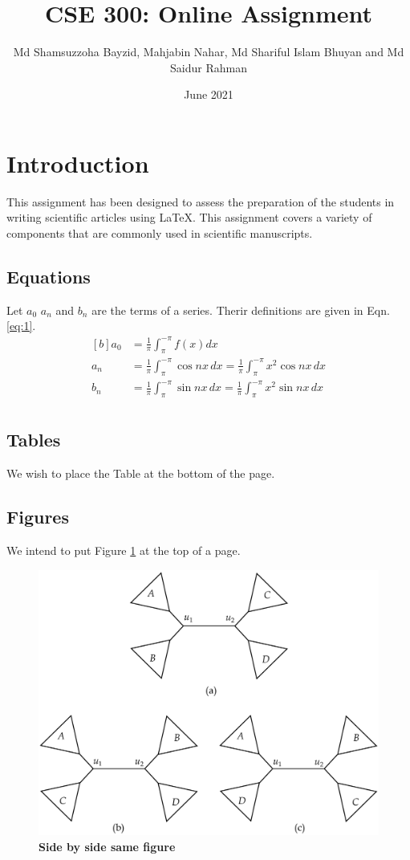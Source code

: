 \documentclass[12pt, a4paper,fleqn]{article}
\title{CSE 300: Online Assignment}
\author{Md Shamsuzzoha Bayzid, Mahjabin Nahar, Md Shariful Islam Bhuyan and Md Saidur Rahman}
\date{June 2021}
\begin{document}
\maketitle

\section{Introduction}
This assignment has been designed to assess the preparation of the students in writing scientific articles using \LaTeX. This assignment covers a variety of components that are commonly used in scientific manuscripts.
    \subsection{Equations}
    Let $a_0$ $a_n$ and $b_n$ are the terms of a series. Therir definitions are given in Eqn. \ref{eq:1}.
    \begin{equation}\label{eq:1}
        \begin{aligned}[b]
            a_0 &= \frac{1}{\pi} \int^{-\pi}_{\pi} f(x) dx \\
            a_n &= \frac{1}{\pi} \int^{-\pi}_{\pi} \cos nx \,dx = \frac{1}{\pi} \int^{-\pi}_{\pi} x^2 \cos nx \,dx \\
            b_n &= \frac{1}{\pi} \int^{-\pi}_{\pi} \sin nx \,dx = \frac{1}{\pi} \int^{-\pi}_{\pi} x^2 \sin nx \,dx \\
        \end{aligned}
    \end{equation}
    \subsection{Tables}
    We wish to place the Table at the bottom of the page.
    \subsection{Figures}
    We intend to put Figure \ref{fig:1} at the top of a page.\pagebreak
    \begin{figure}[t!]
        \centering
        \includegraphics[width=0.60\linewidth]{Figure3.pdf}
        \caption{\label{fig:1}\textbf{Side by side same figure}}
    \end{figure}
\end{document}
